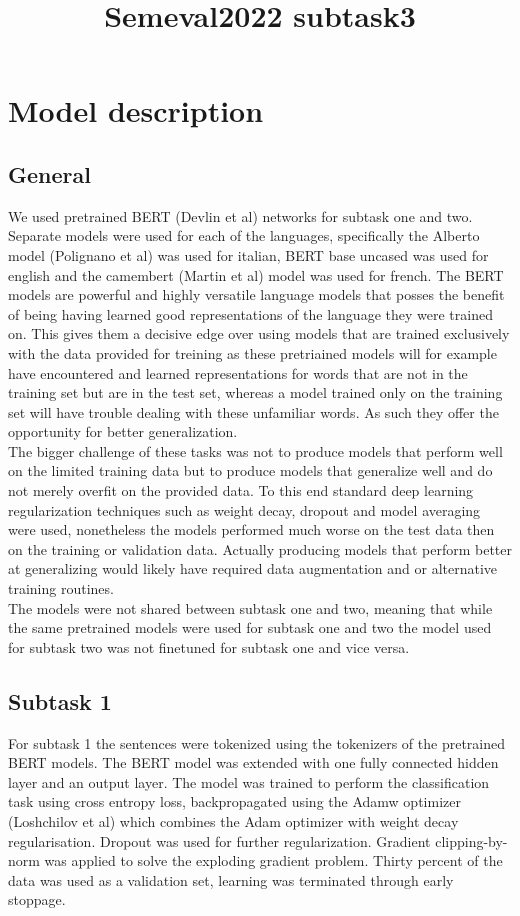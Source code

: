 \documentclass[]{article}
\title{Semeval2022 subtask3 }
\begin{document}
\maketitle


\section*{Model description}

\subsection*{General}
We used pretrained BERT (Devlin et al) networks for subtask one and two. Separate models were used for each of the languages, specifically the Alberto model (Polignano et al) was used for italian, BERT base uncased was used for english and the camembert (Martin et al) model was used for french. The BERT models are powerful and highly versatile language models that posses the benefit of being having learned good representations of the language they were trained on. This gives them a decisive edge over using models that are trained exclusively with the data provided for treining as these pretriained models will for example have encountered and learned representations for words that are not in the training set but are in the test set, whereas a model trained only on the training set will have trouble dealing with these unfamiliar words. As such they offer the opportunity for better generalization.\\
The bigger challenge of  these tasks was not to produce models that perform well on the limited training data but to produce models that generalize well and do not merely overfit on the provided data. To this end standard deep learning regularization techniques such as weight decay, dropout and model averaging were used, nonetheless the models performed much worse on the test data then on the training or validation data. Actually producing models that perform better at generalizing would likely have required data augmentation and or alternative training routines.\\
The models were not shared between subtask one and two, meaning that while the same pretrained models were used for subtask one and two the model used for subtask two was not finetuned for subtask one and vice versa. \\

\subsection*{Subtask 1}
For subtask 1 the sentences were tokenized using the tokenizers of the pretrained BERT models. The BERT model was extended with one fully connected hidden layer and an output layer. The model was trained to perform the classification task using cross entropy loss, backpropagated using the Adamw optimizer (Loshchilov et al) which combines the Adam optimizer with weight decay regularisation. Dropout was used for further regularization. Gradient clipping-by-norm was applied to solve the exploding gradient problem. Thirty percent of the data was used as a validation set, learning was terminated through early stoppage. 
\end{document}
